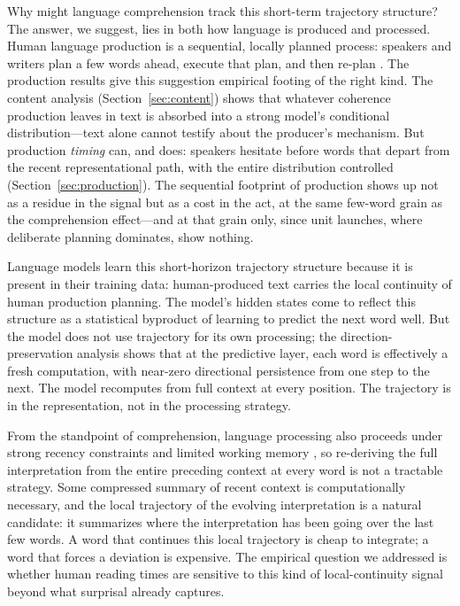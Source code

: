 \documentclass[12pt]{article}
\newcommand{\new}[1]{#1}   %
\begin{document}
Why might language comprehension track this short-term trajectory structure? The answer, we suggest, lies in both how language is produced and processed. Human language production is a sequential, locally planned process: speakers and writers plan a few words ahead, execute that plan, and then re-plan \citep{levelt1989,ferreira2002}. \new{The production results give this suggestion empirical footing of the right kind. The content analysis (Section~\ref{sec:content}) shows that whatever coherence production leaves in text is absorbed into a strong model's conditional distribution---text alone cannot testify about the producer's mechanism. But production \emph{timing} can, and does: speakers hesitate before words that depart from the recent representational path, with the entire distribution controlled (Section~\ref{sec:production}). The sequential footprint of production shows up not as a residue in the signal but as a cost in the act, at the same few-word grain as the comprehension effect---and at that grain only, since unit launches, where deliberate planning dominates, show nothing.}

Language models learn this short-horizon trajectory structure because it is present in their training data: human-produced text carries the local continuity of human production planning. The model's hidden states come to reflect this structure as a statistical byproduct of learning to predict the next word well. But the model does not use trajectory for its own processing; the direction-preservation analysis shows that at the predictive layer, each word is effectively a fresh computation, with near-zero directional persistence from one step to the next. The model recomputes from full context at every position. The trajectory is in the representation, not in the processing strategy.

From the standpoint of comprehension, language processing also proceeds under strong recency constraints and limited working memory \citep{gibson1998,lewis2005}, so re-deriving the full interpretation from the entire preceding context at every word is not a tractable strategy. Some compressed summary of recent context is computationally necessary, and the local trajectory of the evolving interpretation is a natural candidate: it summarizes where the interpretation has been going over the last few words. A word that continues this local trajectory is cheap to integrate; a word that forces a deviation is expensive. The empirical question we addressed is whether human reading times are sensitive to this kind of local-continuity signal beyond what surprisal already captures.
\end{document}
